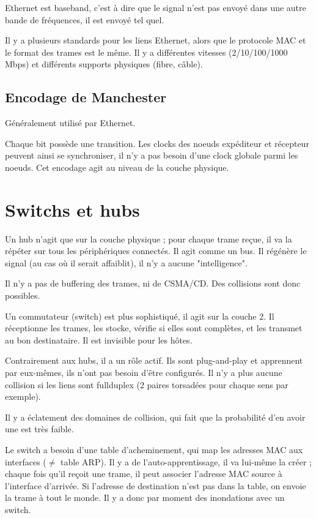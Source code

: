 	
	Ethernet est baseband, c'est à dire que le signal n'est pas envoyé dans une autre bande de fréquences, il est envoyé tel quel.
	
	Il y a plusieurs standards pour les liens Ethernet, alors que le protocole MAC et le format des trames est le même. Il y a différentes vitesses (2/10/100/1000 Mbps) et différents supports physiques (fibre, câble).
	
			

	\subsection{Encodage de Manchester}
	
	Généralement utilisé par Ethernet.
	
	
	Chaque bit possède une transition. Les clocks des noeuds expéditeur et récepteur peuvent ainsi se synchroniser, il n'y a pas besoin d'une clock globale parmi les noeuds. Cet encodage agit au niveau de la couche physique.
	
				
\section{Switchs et hubs}

Un hub n'agit que sur la couche physique ; pour chaque trame reçue, il va la répéter sur tous les périphériques connectés. Il agit comme un bus. Il régénère le signal (au cas où il serait affaiblit), il n'y a aucune "intelligence".

Il n'y a pas de buffering des trames, ni de CSMA/CD. Des collisions sont donc possibles.

Un commutateur (switch) est plus sophistiqué, il agit sur la couche 2. Il réceptionne les trames, les stocke, vérifie si elles sont complètes, et les transmet au bon destinataire. Il est invisible pour les hôtes. 

Contrairement aux hubs, il a un rôle actif. Ils sont plug-and-play et apprennent par eux-mêmes, ils n'ont pas besoin d'être configurés. Il n'y a plus aucune collision si les liens sont fullduplex (2 paires torsadées pour chaque sens par exemple).

Il y a éclatement des domaines de collision, qui fait que la probabilité d'en avoir une est très faible.

Le switch a besoin d'une table d'acheminement, qui map les adresses MAC aux interfaces ($\neq $ table ARP). Il y a de l'auto-apprentissage, il va lui-même la créer ; chaque fois qu'il reçoit une trame, il peut associer l'adresse MAC source à l'interface d'arrivée. Si l'adresse de destination n'est pas dans la table, on envoie la trame à tout le monde. Il y a donc par moment des inondations avec un switch.

